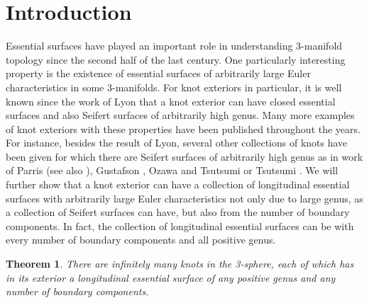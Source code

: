 \documentclass[reqno]{amsart}
\newtheorem{thm}{Theorem}
\theoremstyle{definition}
\theoremstyle{remark}
\begin{document}
\section{Introduction}
Essential surfaces have played an important role in understanding 3-manifold topology since the second half of the last century. One particularly interesting property is the existence of essential surfaces of arbitrarily large Euler characteristics in some 3-manifolds.  For knot exteriors in particular,  it is well known since the work of Lyon \cite{Lyon} that a knot exterior can have closed essential surfaces and also Seifert surfaces of arbitrarily high genus.  Many more examples of knot exteriors with these properties have been published throughout the years.  For instance,  besides the result of Lyon,  several other collections of knots have been given for which there are Seifert surfaces of arbitrarily high genus as in work of Parris \cite{Parris-78} (see also \cite{W-08}),  Gustafson \cite{Gustafson-81},  Ozawa and Tsutsumi \cite{Ozawa-Tsutsumi-03}  or Tsutsumi \cite{Tsutsumi-04}.  We will further show that a knot exterior can have a collection of longitudinal essential surfaces with arbitrarily large Euler characteristics not only due to large genus, as a collection of Seifert surfaces can have, but also from the number of boundary components.  In fact,  the collection of longitudinal essential surfaces can be with every number of boundary components and all positive genus. 


\begin{thm}\label{main}
There are infinitely many knots in the 3-sphere, each of which has in its exterior a longitudinal essential surface of any positive genus and any number of boundary components. 
\end{thm}
\end{document}
